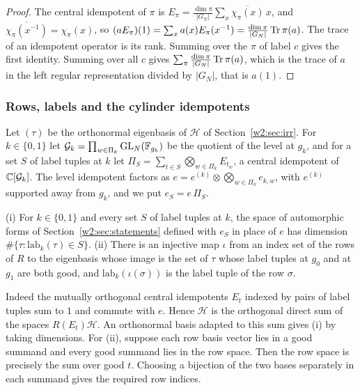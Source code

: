 \begin{proof}
The central idempotent of $\pi$ is $E_\pi=\frac{\dim\pi}{\lvert G_N\rvert}\sum_x\overline{\chi_\pi(x)}\,x$, and $\overline{\chi_\pi(x^{-1})}=\chi_\pi(x)$, so $(aE_\pi)(1)=\sum_xa(x)E_\pi(x^{-1})=\frac{\dim\pi}{\lvert G_N\rvert}\operatorname{Tr}\pi(a)$. The trace of an idempotent operator is its rank. Summing over the $\pi$ of label $c$ gives the first identity. Summing over all $c$ gives $\sum_\pi\frac{\dim\pi}{\lvert G_N\rvert}\operatorname{Tr}\pi(a)$, which is the trace of $a$ in the left regular representation divided by $\lvert G_N\rvert$, that is $a(1)$.
\end{proof}

\subsubsection{Rows, labels and the cylinder idempotents}\label{w2x:sec:rows}

Let $(\tau)$ be the orthonormal eigenbasis of $\mathcal H$ of Section~\ref{w2:sec:irr}. For $k\in\{0,1\}$ let $\mathcal G_k=\prod_{w\in\Pi_k}\operatorname{GL}_N(\mathbb F_{g_k})$ be the quotient of the level at $g_k$, and for a set $S$ of label tuples at $k$ let $\Pi_S=\sum_{t\in S}\bigotimes_{w\in\Pi_k}E_{t_w}$, a central idempotent of $\mathbb C[\mathcal G_k]$. The level idempotent factors as $e=e^{(k)}\otimes\bigotimes_{w\in\Pi_k}e_{k,w}$, with $e^{(k)}$ supported away from $g_k$, and we put $e_S=e\,\Pi_S$.

\begin{hypothesis}\label{w2x:H-lab}
(i) For $k\in\{0,1\}$ and every set $S$ of label tuples at $k$, the space of automorphic forms of Section~\ref{w2:sec:statements} defined with $e_S$ in place of $e$ has dimension $\#\{\tau:\mathrm{lab}_k(\tau)\in S\}$. (ii) There is an injective map $\iota$ from an index set of the rows of $R$ to the eigenbasis whose image is the set of $\tau$ whose label tuples at $g_0$ and at $g_1$ are both good, and $\mathrm{lab}_k(\iota(\sigma))$ is the label tuple of the row $\sigma$.
\end{hypothesis}

Indeed the mutually orthogonal central idempotents $E_t$ indexed by pairs of label tuples sum to $1$ and commute with $e$. Hence $\mathcal H$ is the orthogonal direct sum of the spaces $R(E_t)\mathcal H$. An orthonormal basis adapted to this sum gives (i) by taking dimensions. For (ii), suppose each row basis vector lies in a good summand and every good summand lies in the row space. Then the row space is precisely the sum over good $t$. Choosing a bijection of the two bases separately in each summand gives the required row indices.

